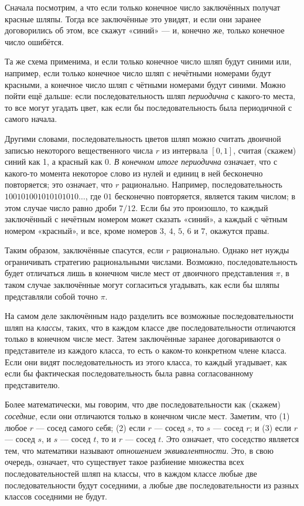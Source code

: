 Сначала посмотрим, а что если только конечное число заключённых получат красные шляпы.
Тогда все заключённые это увидят, и если они заранее договорились об этом, все скажут «синий» --- и, конечно же, только конечное число ошибётся.

Та же схема применима, и если только конечное число шляп будут синими или, например, если только конечное число шляп с нечётными номерами будут красными, а конечное число шляп с чётными номерами будут синими.
Можно пойти ещё дальше: если последовательность шляп \emph{периодична} с какого-то места, то все могут угадать цвет, как если бы последовательность была периодичной с самого начала.

Другими словами, последовательность цветов шляп можно считать двоичной записью некоторого вещественного числа $r$ из интервала $[0,1]$, считая (скажем) синий как 1, а красный как 0.
\emph{В конечном итоге периодична} означает, что с какого-то момента некоторое слово из нулей и единиц в ней бесконечно повторяется;
это означает, что $r$ рационально.
Например, последовательность $100101001010101010\dots$, где $01$ бесконечно повторяется, является таким числом; в этом случае число равно дроби $7/12$.
Если бы это произошло, то каждый заключённый с нечётным номером может сказать «синий», а каждый с чётным номером «красный», и все, кроме номеров $3$, $4$, $5$, $6$ и $7$, окажутся правы.

Таким образом, заключённые спасутся, если $r$ рационально.
Однако нет нужды ограничивать стратегию рациональными числами.
Возможно, последовательность будет отличаться лишь в конечном числе мест от двоичного представления $\pi$, в таком случае заключённые могут согласиться угадывать, как если бы шляпы представляли собой точно $\pi$.

На самом деле заключённым надо разделить все возможные последовательности шляп на \emph{классы}, таких, что в каждом классе две последовательности отличаются только в конечном числе мест.
Затем заключённые заранее договариваются о представителе из каждого класса, то есть о каком-то конкретном члене класса.
Если они видят последовательность из этого класса, то каждый угадывает, как если бы фактическая последовательность была равна согласованному представителю.

Более математически, мы говорим, что две последовательности как (скажем) \emph{соседние}, если они отличаются только в конечном числе мест.
Заметим, что
(1) любое $r$ --- сосед самого себя;
(2) если $r$ --- сосед $s$, то $s$ --- сосед $r$; и
(3) если $r$ --- сосед $s$, и $s$ --- сосед $t$, то и $r$ --- сосед $t$.
Это означает, что соседство является тем, что математики называют \emph{отношением эквивалентности}.
Это, в свою очередь, означает, что существует такое разбиение множества всех последовательностей шляп на классы, что в каждом классе любые две последовательности будут соседними, а любые две последовательности из разных классов соседними не будут.

